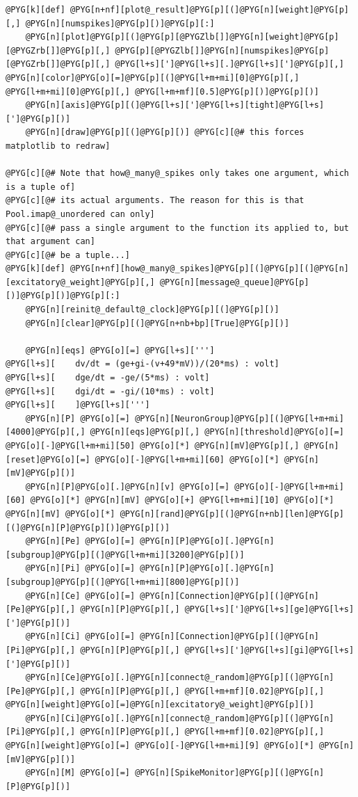 \documentclass[letterpaper,10pt,english]{manual}
\begin{document}
\begin{Verbatim}[commandchars=@\[\]]
@PYG[k][def] @PYG[n+nf][plot@_result]@PYG[p][(]@PYG[n][weight]@PYG[p][,] @PYG[n][numspikes]@PYG[p][)]@PYG[p][:]
    @PYG[n][plot]@PYG[p][(]@PYG[p][@PYGZlb[]]@PYG[n][weight]@PYG[p][@PYGZrb[]]@PYG[p][,] @PYG[p][@PYGZlb[]]@PYG[n][numspikes]@PYG[p][@PYGZrb[]]@PYG[p][,] @PYG[l+s][']@PYG[l+s][.]@PYG[l+s][']@PYG[p][,] @PYG[n][color]@PYG[o][=]@PYG[p][(]@PYG[l+m+mi][0]@PYG[p][,] @PYG[l+m+mi][0]@PYG[p][,] @PYG[l+m+mf][0.5]@PYG[p][)]@PYG[p][)]
    @PYG[n][axis]@PYG[p][(]@PYG[l+s][']@PYG[l+s][tight]@PYG[l+s][']@PYG[p][)]
    @PYG[n][draw]@PYG[p][(]@PYG[p][)] @PYG[c][@# this forces matplotlib to redraw]

@PYG[c][@# Note that how@_many@_spikes only takes one argument, which is a tuple of]
@PYG[c][@# its actual arguments. The reason for this is that Pool.imap@_unordered can only]
@PYG[c][@# pass a single argument to the function its applied to, but that argument can]
@PYG[c][@# be a tuple...]
@PYG[k][def] @PYG[n+nf][how@_many@_spikes]@PYG[p][(]@PYG[p][(]@PYG[n][excitatory@_weight]@PYG[p][,] @PYG[n][message@_queue]@PYG[p][)]@PYG[p][)]@PYG[p][:]
    @PYG[n][reinit@_default@_clock]@PYG[p][(]@PYG[p][)]
    @PYG[n][clear]@PYG[p][(]@PYG[n+nb+bp][True]@PYG[p][)]

    @PYG[n][eqs] @PYG[o][=] @PYG[l+s][''']
@PYG[l+s][    dv/dt = (ge+gi-(v+49*mV))/(20*ms) : volt]
@PYG[l+s][    dge/dt = -ge/(5*ms) : volt]
@PYG[l+s][    dgi/dt = -gi/(10*ms) : volt]
@PYG[l+s][    ]@PYG[l+s][''']
    @PYG[n][P] @PYG[o][=] @PYG[n][NeuronGroup]@PYG[p][(]@PYG[l+m+mi][4000]@PYG[p][,] @PYG[n][eqs]@PYG[p][,] @PYG[n][threshold]@PYG[o][=] @PYG[o][-]@PYG[l+m+mi][50] @PYG[o][*] @PYG[n][mV]@PYG[p][,] @PYG[n][reset]@PYG[o][=] @PYG[o][-]@PYG[l+m+mi][60] @PYG[o][*] @PYG[n][mV]@PYG[p][)]
    @PYG[n][P]@PYG[o][.]@PYG[n][v] @PYG[o][=] @PYG[o][-]@PYG[l+m+mi][60] @PYG[o][*] @PYG[n][mV] @PYG[o][+] @PYG[l+m+mi][10] @PYG[o][*] @PYG[n][mV] @PYG[o][*] @PYG[n][rand]@PYG[p][(]@PYG[n+nb][len]@PYG[p][(]@PYG[n][P]@PYG[p][)]@PYG[p][)]
    @PYG[n][Pe] @PYG[o][=] @PYG[n][P]@PYG[o][.]@PYG[n][subgroup]@PYG[p][(]@PYG[l+m+mi][3200]@PYG[p][)]
    @PYG[n][Pi] @PYG[o][=] @PYG[n][P]@PYG[o][.]@PYG[n][subgroup]@PYG[p][(]@PYG[l+m+mi][800]@PYG[p][)]
    @PYG[n][Ce] @PYG[o][=] @PYG[n][Connection]@PYG[p][(]@PYG[n][Pe]@PYG[p][,] @PYG[n][P]@PYG[p][,] @PYG[l+s][']@PYG[l+s][ge]@PYG[l+s][']@PYG[p][)]
    @PYG[n][Ci] @PYG[o][=] @PYG[n][Connection]@PYG[p][(]@PYG[n][Pi]@PYG[p][,] @PYG[n][P]@PYG[p][,] @PYG[l+s][']@PYG[l+s][gi]@PYG[l+s][']@PYG[p][)]
    @PYG[n][Ce]@PYG[o][.]@PYG[n][connect@_random]@PYG[p][(]@PYG[n][Pe]@PYG[p][,] @PYG[n][P]@PYG[p][,] @PYG[l+m+mf][0.02]@PYG[p][,] @PYG[n][weight]@PYG[o][=]@PYG[n][excitatory@_weight]@PYG[p][)]
    @PYG[n][Ci]@PYG[o][.]@PYG[n][connect@_random]@PYG[p][(]@PYG[n][Pi]@PYG[p][,] @PYG[n][P]@PYG[p][,] @PYG[l+m+mf][0.02]@PYG[p][,] @PYG[n][weight]@PYG[o][=] @PYG[o][-]@PYG[l+m+mi][9] @PYG[o][*] @PYG[n][mV]@PYG[p][)]
    @PYG[n][M] @PYG[o][=] @PYG[n][SpikeMonitor]@PYG[p][(]@PYG[n][P]@PYG[p][)]


\end{Verbatim}
\end{document}
